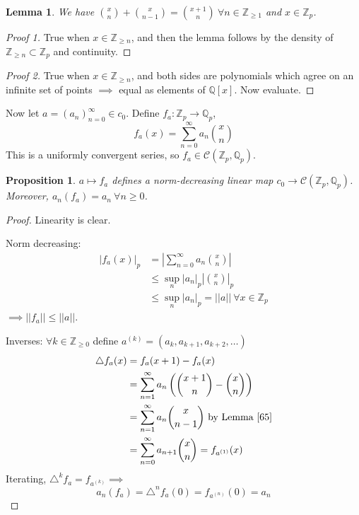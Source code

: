 \documentclass[a4paper]{article}
\newtheorem{lemma}[definition]{Lemma}
\newtheorem{prop}[definition]{Proposition}
\newcommand*\abs[1]{\left|#1\right|}
\newcommand*\norm[1]{\abs{\abs{#1}}}
\begin{document}
\begin{lemma}
	We have
	${x \choose n} + {x \choose n-1} = {x+1 \choose n}\ \forall n \in \mathbb{Z}_{\geq 1}$
	and $x \in \mathbb{Z}_p$.
	\label{65}
\end{lemma}
\begin{proof}[Proof 1]
	True when $x \in \mathbb{Z}_{\geq n}$,
	and then the lemma follows by the density of $\mathbb{Z}_{\geq n} \subset \mathbb{Z}_p$ and continuity.
\end{proof}
\begin{proof}[Proof 2]
	True when $x \in \mathbb{Z}_{\geq n}$,
	and both sides are polynomials which agree on an infinite set of points $\implies$ equal as elements of $\mathbb{Q}[x]$.
	Now evaluate.
\end{proof}

Now let $a = (a_n)_{n=0}^\infty \in c_0$. 
Define $f_a: \mathbb{Z}_p \to \mathbb{Q}_p$,
$$f_a(x) = \sum_{n=0}^\infty a_n {x \choose n}$$
This is a uniformly convergent series,
so $f_a \in \mathcal{C}(\mathbb{Z}_p, \mathbb{Q}_p)$.

\begin{prop}
	$a \mapsto f_a$ defines a norm-decreasing linear map $c_0 \to \mathcal{C}(\mathbb{Z}_p, \mathbb{Q}_p)$.
	Moreover, $a_n(f_a) = a_n\ \forall n \geq 0$.
\end{prop}
\begin{proof}
	Linearity is clear.
	
	Norm decreasing:
	\begin{align*}
		\abs{f_a(x)}_p &= \abs{\sum_{n=0}^\infty a_n {x \choose n}} \\
		&\leq \sup_n \abs{a_n}_p \abs{{x \choose n}}_p \\
		&\leq \sup_n \abs{a_n}_p = \norm{a}\ \forall x \in \mathbb{Z}_p
	\end{align*}
	$\implies \norm{f_a} \leq \norm{a}$.
	
	Inverses: $\forall k \in \mathbb{Z}_{\geq 0}$ define $a^{(k)}=(a_k, a_{k+1}, a_{k+2}, \dots)$
	\begin{align*}
		\triangle f_a(x) &= f_a(x+1)-f_a(x) \\
		&= \sum_{n=1}^\infty a_n\left({x+1 \choose n} - {x \choose n}\right) \\
		&= \sum_{n=1}^\infty a_n {x \choose n-1} \text{ by Lemma \ref{65}} \\
		&= \sum_{n=0}^\infty a_{n+1}{x \choose n} = f_{a^{(1)}}(x)
	\end{align*}
	Iterating, $\triangle^k f_a = f_{a^{(k)}} \implies$
	$$a_n(f_a) = \triangle^n f_a(0) = f_{a^{(n)}}(0) = a_n$$
\end{proof}
\end{document}
